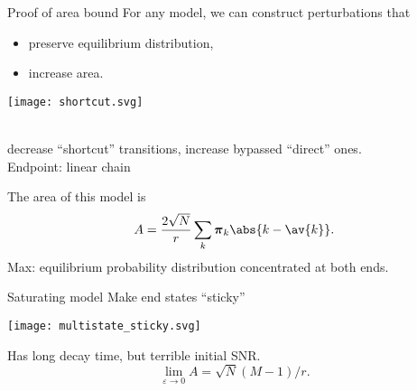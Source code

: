 \documentclass[final]{beamer}%
\newcommand{\eq}{\boldsymbol{\pi}}
\begin{document}
\begin{frame}[label=fr_areaproof]{Proof of area bound}
%
 For any model, we can construct perturbations that
 \parbox[c]{5cm}{
  \begin{itemize}
    \item preserve equilibrium distribution,
    \item increase area.
  \end{itemize}
  \hyperlink{fr_tech}{}
 }
 \parbox[c]{5cm}{
  \begin{center}
    \texttt{[image: shortcut.svg]}
  \end{center}
 }\\
 \eg decrease ``shortcut'' transitions, increase bypassed ``direct'' ones.\\
 Endpoint: linear chain

 \vp The area of this model is
 \begin{equation*}
   A = \frac{2\sqrt{N}}{r}\sum_k \eq_k \abs{k-\av{k}}.
 \end{equation*}
 \note[item]{max given $\eq$}
 \note[item]{now max \wrt $\eq$}
 Max: equilibrium probability distribution concentrated at both ends.
 \\
%
\end{frame}


\begin{frame}{Saturating model}
%
 Make end states ``sticky''
 \begin{center}
   \texttt{[image: multistate\_sticky.svg]}
 \end{center}
 Has long decay time, but terrible initial SNR.
 \begin{equation*}
   \lim_{\varepsilon\to0}A=\sqrt{N}(M-1)/r.
 \end{equation*}
%
\end{frame}

\end{document}
